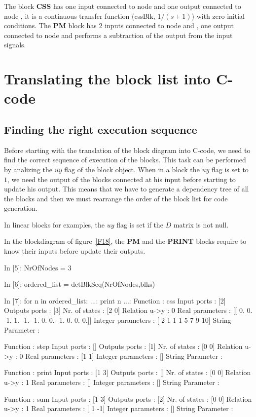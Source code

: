 The block \textbf{CSS} has one input connected to node  and 
one output connected to node , it is a continuous transfer function 
(cssBlk, $1/(s+1)$) with zero initial conditions. The \textbf{PM} block has 
2 inputs connected to node  and , one output 
connected to node  and performs a subtraction of the output from the 
input signals.

\section{Translating the block list into C-code}
\subsection{Finding the right execution sequence}
Before starting with the translation of the block diagram into C-code, we need 
to find the correct sequence of execution of the blocks. This task can be 
performed by analizing the $uy$ flag of the block object. 
When in a block the $uy$ flag is set to $1$, we need the output of the blocks 
connected at his input before starting to update his output.
This means that we have to generate a dependency tree of all the blocks and 
then we must rearrange the order of the block list for code generation.

In linear blocks for examples, the $uy$ flag is set if the $D$ matrix is not 
null.

In the blockdiagram of figure~\ref{F18}, the \textbf{PM} and the 
\textbf{PRINT} blocks require to know their inputs before update their 
outputs.

\begin{code}
In [5]: NrOfNodes = 3

In [6]: ordered_list = detBlkSeq(NrOfNodes,blks)

In [7]: for n in ordered_list:
   ...:     print n
   ...:     
Function           : css
Input ports        : [2]
Outputs ports      : [3]
Nr. of states      : [2 0]
Relation u->y      : 0
Real parameters    : [[ 0.  0. -1.  1. -1. -1.  
                        0.  0. -1.  0.  0.  0.]]
Integer parameters : [ 2  1  1  1  5  7  9 10]
String Parameter   : 

Function           : step
Input ports        : []
Outputs ports      : [1]
Nr. of states      : [0 0]
Relation u->y      : 0
Real parameters    : [1 1]
Integer parameters : []
String Parameter   : 

Function           : print
Input ports        : [1 3]
Outputs ports      : []
Nr. of states      : [0 0]
Relation u->y      : 1
Real parameters    : []
Integer parameters : []
String Parameter   : 

Function           : sum
Input ports        : [1 3]
Outputs ports      : [2]
Nr. of states      : [0 0]
Relation u->y      : 1
Real parameters    : [ 1 -1]
Integer parameters : []
String Parameter   : 
\end{code}

